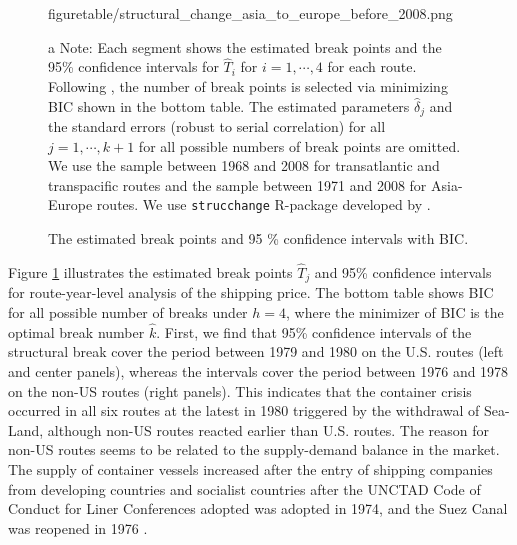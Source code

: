 \documentclass[11pt]{article}
\begin{document}
\begin{figure}[!ht]
\begin{minipage}[b]{0.3\linewidth}
  {figuretable/structural_change_asia_to_europe_before_2008.png}
  \end{minipage}
  {\scriptsize{}
  
\caption{The estimated break points and 95 \% confidence intervals with BIC.}
\label{fg:structural_change_transatlantic_eastbound_before_2008}
\begin{tablenotes}
\item[a]Note: Each segment shows the estimated break points and the 95\% confidence intervals for $\hat{T}_i$ for $i=1,\cdots,4$ for each route. Following \cite{bai2003computation}, the number of break points is selected via minimizing BIC shown in the bottom table. The estimated parameters $\hat{\delta}_j$ and the standard errors (robust to serial correlation) for all $j=1,\cdots,k+1$ for all possible numbers of break points are omitted. We use the sample between 1968 and 2008 for transatlantic and transpacific routes and the sample between 1971 and 2008 for Asia-Europe routes. We use \texttt{strucchange} R-package developed by \cite{zeileis2002strucchange}.
   \end{tablenotes}
   }
\end{figure}

Figure \ref{fg:structural_change_transatlantic_eastbound_before_2008} illustrates the estimated break points $\hat{T}_j$ and 95\% confidence intervals for route-year-level analysis of the shipping price. The bottom table shows BIC for all possible number of breaks under $h=4$, where the minimizer of BIC is the optimal break number $\hat{k}$. First, we find that 95\% confidence intervals of the structural break cover the period between 1979 and 1980 on the U.S. routes (left and center panels), whereas the intervals cover the period between 1976 and 1978 on the non-US routes (right panels). This indicates that the container crisis occurred in all six routes at the latest in 1980 triggered by the withdrawal of Sea-Land, although non-US routes reacted earlier than U.S. routes. The reason for non-US routes seems to be related to the supply-demand balance in the market. The supply of container vessels increased after the entry of shipping companies from developing countries and socialist countries after the UNCTAD Code of Conduct for Liner Conferences adopted was adopted in 1974, and the Suez Canal was reopened in 1976 \citep{jsme2022}.
\end{document}

